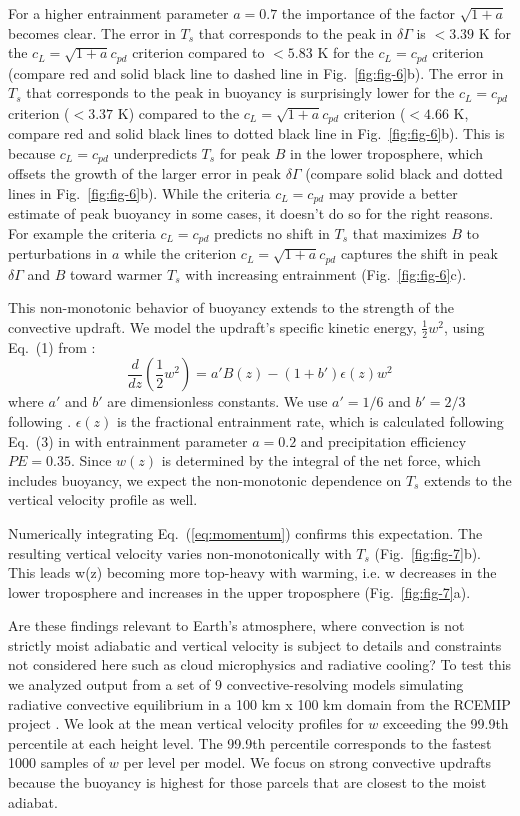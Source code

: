 \documentclass[draft]{ametsocV6.1}
\begin{document}
For a higher entrainment parameter $a=0.7$ the importance of the factor $\sqrt{1+a}$ becomes clear. The error in $T_s$ that corresponds to the peak in $\delta \Gamma$ is $<3.39$ K for the $c_L=\sqrt{1+a}c_{pd}$ criterion compared to $<5.83$ K for the $c_L=c_{pd}$ criterion (compare red and solid black line to dashed line in Fig.~\ref{fig:fig-6}b). The error in $T_s$ that corresponds to the peak in buoyancy is surprisingly lower for the $c_L=c_{pd}$ criterion ($<3.37$ K) compared to the $c_L=\sqrt{1+a}c_{pd}$ criterion ($<4.66$ K, compare red and solid black lines to dotted black line in Fig.~\ref{fig:fig-6}b). This is because $c_L=c_{pd}$ underpredicts $T_s$ for peak $B$ in the lower troposphere, which offsets the growth of the larger error in peak $\delta \Gamma$ (compare solid black and dotted lines in Fig.~\ref{fig:fig-6}b). While the criteria $c_L=c_{pd}$ may provide a better estimate of peak buoyancy in some cases, it doesn't do so for the right reasons. For example the criteria $c_L=c_{pd}$ predicts no shift in $T_s$ that maximizes $B$ to perturbations in $a$ while the criterion $c_L=\sqrt{1+a}c_{pd}$ captures the shift in peak $\delta \Gamma$ and $B$ toward warmer $T_s$ with increasing entrainment (Fig.~\ref{fig:fig-6}c).

This non-monotonic behavior of buoyancy extends to the strength of the convective updraft. We model the updraft's specific kinetic energy, $\frac{1}{2}w^2$, using Eq.~(1) from \cite{delgenio2007}:
\begin{equation}
\frac{d}{dz}\left(\frac{1}{2}w^2\right)=a'B(z)-(1+b')\epsilon(z)w^2 \label{eq:momentum}
\end{equation}
where $a'$ and $b'$ are dimensionless constants. We use $a'=1/6$ and $b'=2/3$ following \cite{delgenio2007}. $\epsilon(z)$ is the fractional entrainment rate, which is calculated following Eq.~(3) in \cite{romps2016} with entrainment parameter $a=0.2$ and precipitation efficiency $PE=0.35$. Since $w(z)$ is determined by the integral of the net force, which includes buoyancy, we expect the non-monotonic dependence on $T_s$ extends to the vertical velocity profile as well.

Numerically integrating Eq.~(\ref{eq:momentum}) confirms this expectation. The resulting vertical velocity varies non-monotonically with $T_s$ (Fig.~\ref{fig:fig-7}b). This leads w(z) becoming more top-heavy with warming, i.e. w decreases in the lower troposphere and increases in the upper troposphere (Fig.~\ref{fig:fig-7}a).

Are these findings relevant to Earth's atmosphere, where convection is not strictly moist adiabatic and vertical velocity is subject to details and constraints not considered here such as cloud microphysics and radiative cooling? To test this we analyzed output from a set of 9 convective-resolving models simulating radiative convective equilibrium in a 100 km x 100 km domain from the RCEMIP project \citep{wing2018}. We look at the mean vertical velocity profiles for $w$ exceeding the 99.9th percentile at each height level. The 99.9th percentile corresponds to the fastest 1000 samples of $w$ per level per model. We focus on strong convective updrafts because the buoyancy is highest for those parcels that are closest to the moist adiabat.
\end{document}
